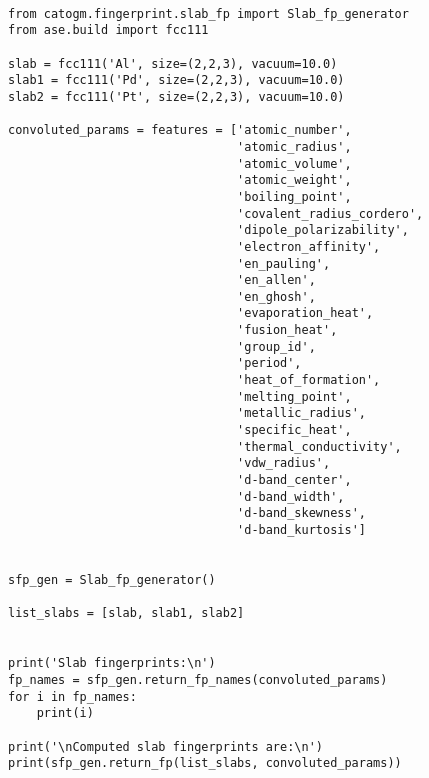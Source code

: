 \documentclass[11pt]{article}
\begin{document}
\begin{verbatim}

from catogm.fingerprint.slab_fp import Slab_fp_generator
from ase.build import fcc111

slab = fcc111('Al', size=(2,2,3), vacuum=10.0)
slab1 = fcc111('Pd', size=(2,2,3), vacuum=10.0)
slab2 = fcc111('Pt', size=(2,2,3), vacuum=10.0)

convoluted_params = features = ['atomic_number',                                            
                                'atomic_radius',                                            
                                'atomic_volume',                                            
                                'atomic_weight',                                            
                                'boiling_point',                                            
                                'covalent_radius_cordero',                                  
                                'dipole_polarizability',                                    
                                'electron_affinity',                                        
                                'en_pauling',                                               
                                'en_allen',                                                 
                                'en_ghosh',                                                 
                                'evaporation_heat',                                         
                                'fusion_heat',                                              
                                'group_id',                                                 
                                'period',                                                   
                                'heat_of_formation',                                        
                                'melting_point',                                            
                                'metallic_radius',                                          
                                'specific_heat',                                            
                                'thermal_conductivity',                                     
                                'vdw_radius',                                               
                                'd-band_center',                                            
                                'd-band_width',                                             
                                'd-band_skewness',                                          
                                'd-band_kurtosis']     


sfp_gen = Slab_fp_generator()

list_slabs = [slab, slab1, slab2]


print('Slab fingerprints:\n')
fp_names = sfp_gen.return_fp_names(convoluted_params)
for i in fp_names:
    print(i)

print('\nComputed slab fingerprints are:\n')
print(sfp_gen.return_fp(list_slabs, convoluted_params))

\end{verbatim}
\end{document}
